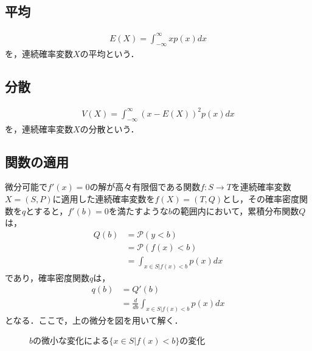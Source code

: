 \documentclass[dvipdfmx]{jsarticle}
\begin{document}
 \subsection{平均}
 \begin{align}
  E\left(X\right)=\int_{-\infty}^\infty xp\left(x\right)dx
 \end{align}
を，連続確率変数$X$の平均という．
 \subsection{分散}
 \begin{align}
  V\left(X\right)=\int_{-\infty}^\infty \left(x-E\left(X\right)\right)^2p\left(x\right)dx
 \end{align}
を，連続確率変数$X$の分散という．
 \subsection{関数の適用}
微分可能で$f'\left(x\right)=0$の解が高々有限個である関数$f:S\to T$を連続確率変数$X=\left(S,P\right)$に適用した連続確率変数を$f\left(X\right)=\left(T,Q\right)$とし，その確率密度関数を$q$とすると，$f'\left(b\right)=0$を満たすような$b$の範囲内において，累積分布関数$Q$は，
 \begin{align}
  Q\left(b\right)&=\mathscr{P}\left(y<b\right)\nonumber\\
  &=\mathscr{P}\left(f\left(x\right)<b\right)\nonumber\\
  &=\int_{x\in S|f\left(x\right)<b}p\left(x\right)dx
 \end{align}
であり，確率密度関数$q$は，
 \begin{align}
  q\left(b\right)&=Q'\left(b\right)\nonumber\\
  &=\frac{d}{db}\int_{x\in S|f\left(x\right)<b}p\left(x\right)dx
 \end{align}
となる．ここで，上の微分を図を用いて解く．
 \begin{figure}[H]
  \begin{center}
   \caption{$b$の微小な変化による$\{x\in S|f\left(x\right)<b\}$の変化}\label{IntegrationRangeChange}
  \end{center}
 \end{figure}
\end{document}
